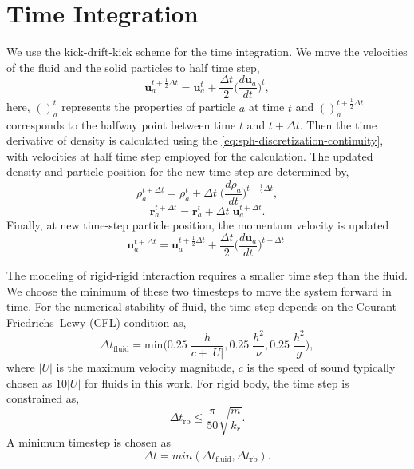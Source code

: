 \documentclass[preprint,12pt]{elsarticle}
\newcommand{\ten}[1]{\ensuremath{\mathbf{#1}}}
\begin{document}
\FloatBarrier%
\section{Time Integration}

We use the kick-drift-kick scheme \cite{monaghan-review:2005} for the time integration. We move the
velocities of the fluid and the solid particles to half time step,
\begin{equation}
  \label{eq:velocity-update-stage-1}
  \ten{u}_a^{t+\frac{1}{2} \Delta t} = \ten{u}_a^{t} + \frac{\Delta t}{2} \bigg(\frac{d\ten{u}_{a}}{dt}\bigg)^t,
\end{equation}
here, $()_a^t$ represents the properties of particle $a$ at time $t$ and
$()_a^{t+\frac{1}{2} \Delta t}$ corresponds to the halfway point between time
$t$ and $t + \Delta t$. Then the time derivative of density is calculated using the
\cref{eq:sph-discretization-continuity}, with velocities at half time step
employed for the calculation.  The updated density and particle position for
the new time step are determined by,
\begin{equation}
  \label{eq:density-update-stage-2}
  \rho_{a}^{t+\Delta t} = \rho_{a}^{t} + \Delta t \; \bigg(\frac{d\rho_{a}}{dt}\bigg)^{t+\frac{1}{2} \Delta t},
\end{equation}
\begin{equation}
  \label{eq:position-update-stage-2}
  \ten{r}_{a}^{t+\Delta t} = \ten{r}_{a}^{t} + \Delta t \; \ten{u}_{a}^{t+\Delta t}.
\end{equation}
%
Finally, at new time-step particle position, the momentum velocity is updated
\begin{equation}
  \label{eq:velocity-update-stage-3}
  \ten{u}_a^{t+\Delta t} = \ten{u}_a^{t+\frac{1}{2}\Delta t} + \frac{\Delta t}{2} \bigg(\frac{d\ten{u}_{a}}{dt}\bigg)^{t+\Delta t}.
\end{equation}


The modeling of rigid-rigid interaction requires a smaller time step than the
fluid. We choose the minimum of these two timesteps to move the system forward
in time. For the numerical stability of fluid, the time step depends on the
Courant–Friedrichs–Lewy (CFL) condition \cite{monaghan-review:2005} as,
\begin{equation}
  \label{eq:rfc:time-step-cfl}
  \Delta t_{\text{fluid}} = \mathrm{min} \bigg( 0.25 \; \frac{h}{c + |U|} ,  0.25 \; \frac{h^2}{\nu},  0.25 \; \frac{h^2}{g} \bigg),
\end{equation}
where $|U|$ is the maximum velocity magnitude, $c$ is the speed of sound
typically chosen as $10 |U|$ for fluids in this work. For rigid body, the time
step is constrained \cite{cundall_discrete_1979} as,
\begin{equation}
  \label{eq:rfc:time-step-body-force}
  \Delta t_{\text{rb}} \leq \frac{\pi}{50} \sqrt{\frac{m}{k_r}}.
\end{equation}
A minimum timestep is chosen as
\begin{equation}
  \label{eq:rfc:time-step-body-force}
  \Delta t = min(\Delta t_{\text{fluid}}, \Delta t_{\text{rb}}).
\end{equation}
\end{document}
